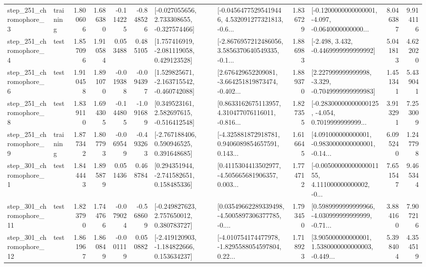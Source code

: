 \begin{tabular}{llrrrrllrlrr}
   step\_251\_chromophore\_3 &  training &      1.800606 &    1.686380 &     -0.114225 & -0.848526 &   [-0.027055656, 2.733308655, -0.327574466] &  [-0.04564775295419446, 4.532091277321813, -0.6... &       1.836729 &  [-0.1200000000000001, -4.097, -0.0640000000000... &            8.046387 &          9.914116 \\
   step\_251\_chromophore\_4 &      test &      1.857096 &    1.910584 &      0.053488 &  0.485105 &    [1.757416919, -2.081119058, 0.429123528] &  [-2.8676957212486056, 3.5856370640549335, -0.1... &       1.886983 &               [-2.498, 3.432, -0.4469999999999992] &            5.041813 &          4.622020 \\
   step\_251\_chromophore\_6 &      test &      1.910458 &    1.891070 &     -0.019388 & -0.094397 &   [1.529825671, -2.163715542, -0.460742088] &  [2.676429652209081, -3.664251819873474, -0.402... &       1.889370 &   [2.227999999999998, -3.329, -0.7049999999999983] &            1.451341 &          5.439041 \\
   step\_251\_chromophore\_8 &      test &      1.839110 &    1.694305 &     -0.144805 & -1.091689 &    [0.349523161, 2.582697615, -0.516412548] &  [0.8633162675113957, 4.310477076116011, -0.816... &       1.827355 &  [-0.28300000000000125, -4.054, 0.7019999999999... &            3.913291 &          7.253009 \\
   step\_251\_chromophore\_9 &  training &      1.877342 &    1.807793 &     -0.069549 & -0.493263 &    [-2.767188406, 0.590946525, 0.391648685] &  [-4.325881872918781, 0.9406089854657591, 0.143... &       1.616645 &  [4.091000000000001, -0.9830000000000001, -0.14... &            6.095240 &          1.247798 \\
   step\_301\_chromophore\_1 &      test &      1.844443 &    1.895879 &      0.051436 &  0.468784 &    [0.294351944, -2.741582651, 0.158485336] &  [0.4115304413502977, -4.505665681906357, 0.003... &       1.774712 &  [-0.0050000000000001155, 4.111000000000002, -0... &            7.651547 &          9.465344 \\
  step\_301\_chromophore\_11 &      test &      1.823790 &    1.744766 &     -0.079024 & -0.568609 &    [-0.249827623, 2.757650012, 0.380783727] &  [0.03549662289339498, -4.5005897306377785, -0.... &       1.793450 &  [0.5989999999999966, -4.030999999999999, -0.71... &            3.884160 &          7.907216 \\
  step\_301\_chromophore\_12 &      test &      1.861967 &    1.860849 &     -0.001119 &  0.050882 &   [-2.419120903, -1.184822666, 0.153634237] &  [-4.010754174477978, -1.8295588054597804, 0.22... &       1.718923 &  [3.905000000000001, 1.5380000000000003, -0.449... &            5.398404 &          4.354519 \\

\end{tabular}
